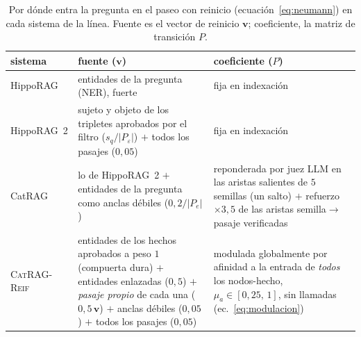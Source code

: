 \documentclass[11pt,a4paper]{article}
\newcommand{\sys}{\textsc{CatRAG-Reif}}          %
\newcommand{\hippo}{HippoRAG~2}
\begin{document}
\begin{table}[t]
\centering\footnotesize\setlength{\tabcolsep}{3.5pt}
\caption{Por dónde entra la pregunta en el paseo con reinicio
(ecuación~\ref{eq:neumann}) en cada sistema de la línea. \guillemotleft{}Fuente\guillemotright{}
es el vector de reinicio $\mathbf{v}$; \guillemotleft{}coeficiente\guillemotright{}, la matriz de
transición $P$.}
\label{tab:palancas}
\begin{tabular}{lp{}p{}}
\toprule
sistema & fuente ($\mathbf{v}$) & coeficiente ($P$)\\
\midrule
HippoRAG & entidades de la pregunta (NER), fuerte & fija en indexación\\
\addlinespace
\hippo{} & sujeto y objeto de los tripletes aprobados por el filtro
  ($s_q/|P_\varepsilon|$) $+$ todos los pasajes ($0{,}05$) & fija en
  indexación\\
\addlinespace
CatRAG & lo de \hippo{} $+$ entidades de la pregunta como anclas débiles
  ($0{,}2/|P_e|$) & reponderada por juez LLM en las aristas salientes de
  $5$ semillas (un salto) $+$ refuerzo $\times 3{,}5$ de las aristas
  semilla$\to$pasaje verificadas\\
\addlinespace
\sys{} & entidades de los hechos aprobados a peso $1$ (compuerta dura)
  $+$ entidades enlazadas ($0{,}5$) $+$ \emph{pasaje propio} de cada una
  ($0{,}5\,\mathbf{v}$) $+$ anclas débiles ($0{,}05$) $+$ todos los
  pasajes ($0{,}05$) & modulada globalmente por afinidad a la entrada de
  \emph{todos} los nodos-hecho, $\mu_a\in[0{,}25,\,1]$, sin llamadas
  (ec.~\ref{eq:modulacion})\\
\bottomrule
\end{tabular}
\end{table}
\end{document}
